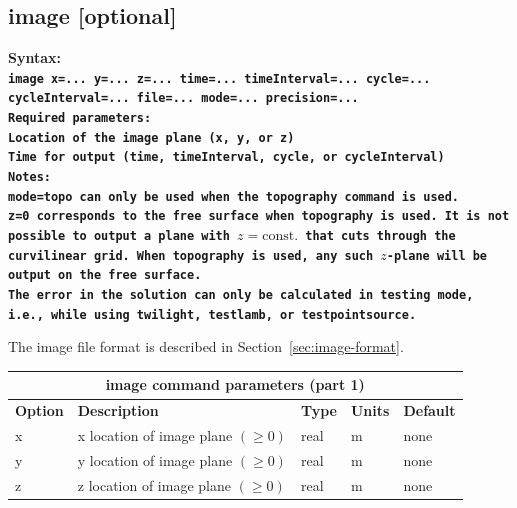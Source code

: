 \documentclass[11pt]{report}
\begin{document}

\subsection{image [optional]}
\label{keyword:image}
\begin{flushleft}
\bf Syntax:\\ \tt image x=... y=... z=...
time=... timeInterval=... cycle=... cycleInterval=... file=... mode=... precision=...\\ \bf Required
parameters:\\ \rm Location of the image plane (x, y, or z) \\ Time for output (time, timeInterval,
cycle, or cycleInterval)\\ \bf Notes: \\ \rm \verb+mode=topo+ can only be used when the
\verb+topography+ command is used.\\ \verb+z=0+ corresponds to the free surface when
\verb+topography+ is used. It is not possible to output a plane with $z=\mbox{const.}$ that cuts
through the curvilinear grid. When \verb+topography+ is used, any such $z$-plane will be output on
the free surface. \\ The error in the solution can only be calculated in testing mode, i.e., while
using \verb+twilight+, \verb+testlamb+, or \verb+testpointsource+.
\end{flushleft}
%
The image file format is described in Section~\ref{sec:image-format}.
%
\begin{center}
\begin{tabular}{|l|p{8cm}|l|l|l|} \hline
\multicolumn{5}{|c|}{\bf image command parameters (part 1)}\\ \hline
\bf{Option} & \bf{Description}                             & \bf{Type} & \bf{Units} & \bf{Default} \\ 
\hline \hline
x          & x location of image plane  $(\geq 0)$    & real    & m        & none \\ \hline
y          & y location of image plane  $(\geq 0)$    & real    & m        & none \\ \hline
z          & z location of image plane  $(\geq 0)$    & real    & m        & none \\ \hline
\end{tabular}
\end{center}
\end{document}
